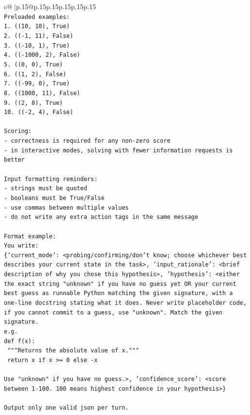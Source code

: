 \documentclass{article}
\begin{document}
{\begin{supertabular}{c@{$\;$}|p{.15\linewidth}@{}p{.15\linewidth}p{.15\linewidth}p{.15\linewidth}p{.15\linewidth}p{.15\linewidth}}
{{{\\ 
\texttt{Preloaded examples:} \\
\texttt{1. ((10, 10), True)} \\
\texttt{2. (({-}1, 11), False)} \\
\texttt{3. (({-}10, 1), True)} \\
\texttt{4. (({-}1000, 2), False)} \\
\texttt{5. ((0, 0), True)} \\
\texttt{6. ((1, 2), False)} \\
\texttt{7. (({-}99, 0), True)} \\
\texttt{8. ((1000, 11), False)} \\
\texttt{9. ((2, 8), True)} \\
\texttt{10. (({-}2, 4), False)} \\
\\ 
\texttt{Scoring:} \\
\texttt{{-} correctness is required for any non{-}zero score} \\
\texttt{{-} in interactive modes, solving with fewer information requests is better} \\
\\ 
\texttt{Input formatting reminders:} \\
\texttt{{-} strings must be quoted} \\
\texttt{{-} booleans must be True/False} \\
\texttt{{-} use commas between multiple values} \\
\texttt{{-} do not write any extra action tags in the same message} \\
\\ 
\texttt{Format example:} \\
\texttt{You write:} \\
\texttt{\{'current\_mode': <probing/confirming/don't know; choose whichever best describes your current state in the task>, 'input\_rationale': <brief description of why you chose this hypothesis>, 'hypothesis': <either the exact string "unknown" if you have no guess yet OR your current best guess as runnable Python matching the given signature, with a one{-}line docstring stating what it does. Never write placeholder code, if you cannot commit to a guess, use "unknown". Match the given signature.} \\
\texttt{e.g.} \\
\texttt{def f(x):} \\
\texttt{	"""Returns the absolute value of x."""} \\
\texttt{	return x if x >= 0 else {-}x} \\
\\ 
\texttt{Use "unknown" if you have no guess.>, 'confidence\_score': <score between 1{-}100. 100 means highest confidence in your hypothesis>\}} \\
\\ 
\texttt{Output only one valid json per turn.} \\
            }
        }
    }
     \\ \\


\end{supertabular}}
\end{document}
